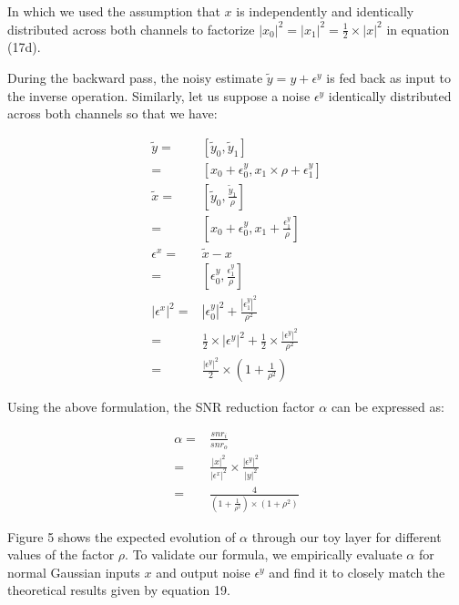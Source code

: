 \documentclass[twocolumn]{bmcart}
\begin{document}
In which we used the assumption that $x$ is independently and identically distributed across both channels
to factorize $|x_0|^2 = |x_1|^2 = \frac{1}{2} \times |x|^2$ in equation (17d).
 
During the backward pass, the noisy estimate $\tilde{y}=y+\epsilon^y$ is fed back as input to the inverse operation. 
Similarly, let us suppose a noise $\epsilon^y$ identically distributed across both channels so that we have:

\begin{subequations}
\begin{align}
\tilde{y}       =& [ \tilde{y}_0, \tilde{y}_1 ] \\
                =& [ x_0 + \epsilon_0^y, x_1 \times \rho + \epsilon_1^y ] \\
\tilde{x}       =& [ \tilde{y}_0, \frac{\tilde{y}_1}{\rho}] \\
                =& [ x_0 + \epsilon_{0}^y, x_1 + \frac{\epsilon_{1}^y}{\rho} ]\\
\epsilon^x      =& \tilde{x} - x\\
                =& [ \epsilon_0^y, \frac{\epsilon_{1}^y}{\rho} ]\\
|\epsilon^x|^2  =& |\epsilon_0^y|^2 + \frac{|\epsilon_1^y|^2}{\rho^2} \\
                =& \frac{1}{2} \times |\epsilon^y|^2 + \frac{1}{2} \times \frac{|\epsilon^y|^2}{\rho^2} \\
                =& \frac{|\epsilon^y|^2}{2} \times (1 + \frac{1}{\rho^2})
\end{align}
\end{subequations}

Using the above formulation, the SNR reduction factor $\alpha$ can be expressed as:

\begin{subequations}
\begin{align}
\alpha =& \frac{snr_i}{snr_o} \\
 =& \frac{|x|^2}{|\epsilon^x|^2} \times  \frac{|\epsilon^y|^2}{|y|^2} \\
 =& \frac{4}{(1+\frac{1}{\rho^2}) \times (1 + \rho^2)}
\end{align}
\end{subequations}

Figure 5 shows the expected evolution of $\alpha$ through our toy layer for different values of the factor $\rho$.
To validate our formula, we empirically evaluate $\alpha$ for normal Gaussian inputs $x$ and output noise $\epsilon^y$ and find it to closely match the theoretical results given by equation 19. 
\end{document}
